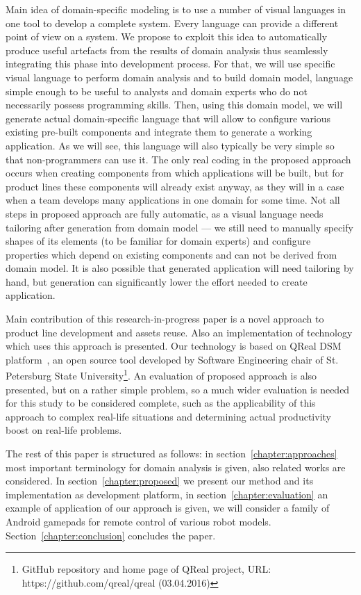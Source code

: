 \documentclass[conference]{IEEEtran}
\begin{document}
Main idea of domain-specific modeling is to use a number of visual languages in one tool to develop a complete system. Every language can provide a different point of view on a system. We propose to exploit this idea to automatically produce useful artefacts from the results of domain analysis thus seamlessly integrating this phase into development process. For that, we will use specific visual language to perform domain analysis and to build domain model, language simple enough to be useful to analysts and domain experts who do not necessarily possess programming skills. Then, using this domain model, we will generate actual domain-specific language that will allow to configure various existing pre-built components and integrate them to generate a working application. As we will see, this language will also typically be very simple so that non-programmers can use it. The only real coding in the proposed approach occurs when creating components from which applications will be built, but for product lines these components will already exist anyway, as they will in a case when a team develops many applications in one domain for some time. Not all steps in proposed approach are fully automatic, as a visual language needs tailoring after generation from domain model --- we still need to manually specify shapes of its elements (to be familiar for domain experts) and configure properties which depend on existing components and can not be derived from domain model. It is also possible that generated application will need tailoring by hand, but generation can significantly lower the effort needed to create application.

Main contribution of this research-in-progress paper is a novel approach to product line development and assets reuse. Also an implementation of technology which uses this approach is presented. Our technology is based on QReal DSM platform~\cite{kuzenkova2013qreal}, an open source tool developed by Software Engineering chair of St. Petersburg State University\footnote{GitHub repository and home page of QReal project, URL: https://github.com/qreal/qreal (03.04.2016)}. An evaluation of proposed approach is also presented, but on a rather simple problem, so a much wider evaluation is needed for this study to be considered complete, such as the applicability of this approach to complex real-life situations and determining actual productivity boost on real-life problems.

The rest of this paper is structured as follows: in section~\ref{chapter:approaches} most important terminology for domain analysis is given, also related works are considered. In section~\ref{chapter:proposed} we present our method and its implementation as development platform, in section~\ref{chapter:evaluation} an example of application of our approach is given, we will consider a family of Android gamepads for remote control of various robot models. Section~\ref{chapter:conclusion} concludes the paper.
\end{document}
